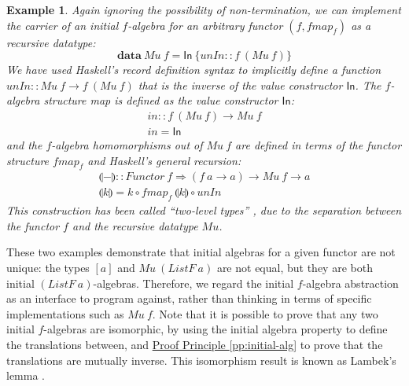 \documentclass{jfp1}
\newcommand{\fold}[1]{\llparenthesis #1 \rrparenthesis}
\newtheorem{example}{Example}
\newcommand{\proofprinref}[1]{\hyperref[#1]{Proof Principle \ref*{#1}}}
\newcommand{\kw}[1]{\textbf{#1}}
\begin{document}
\begin{example}
  Again ignoring the possibility of non-termination, we can implement
  the carrier of an initial $f$-algebra for an arbitrary functor $(f,
  \mathit{fmap}_f)$ as a recursive datatype:
  \begin{equation}\label{eq:mu-defn}
    \kw{data}~\mathit{Mu}~f = \mathsf{In}~\{ \mathit{unIn} :: f~(\mathit{Mu}~f) \}
  \end{equation}
  We have used Haskell's record definition syntax to implicitly define
  a function $\mathit{unIn} :: \mathit{Mu}~f \to f~(\mathit{Mu}~f)$
  that is the inverse of the value constructor $\mathsf{In}$.  The
  $f$-algebra structure map is defined as the value
  constructor $\mathsf{In}$:
  \begin{displaymath}
    \begin{array}{l}
      \mathit{in} :: f~(\mathit{Mu}~f) \to \mathit{Mu}~f \\
      \mathit{in} = \mathsf{In}
    \end{array}
  \end{displaymath}
  and the $f$-algebra homomorphisms out of $\mathit{Mu}~f$ are defined
  in terms of the functor structure $\mathit{fmap}_f$ and Haskell's
  general recursion:
  \begin{displaymath}
    \begin{array}{l}
      \fold{-} :: \mathit{Functor}~f \Rightarrow (f~a \to a) \to \mathit{Mu}~f \to a \\
      \fold{k} = k \circ \mathit{fmap}_f~\fold{k} \circ \mathit{unIn}
    \end{array}
  \end{displaymath}
  This construction has been called ``two-level types''
  \cite{sheard04twolevel}, due to the separation between the functor
  $f$ and the recursive datatype $\mathit{Mu}$.
\end{example}

These two examples demonstrate that initial algebras for a given
functor are not unique: the types $[a]$ and
$\mathit{Mu}~(\mathit{ListF}~a)$ are not equal, but they are both
initial $(\mathit{ListF}~a)$-algebras. Therefore, we regard the
initial $f$-algebra abstraction as an interface to program against,
rather than thinking in terms of specific implementations such as
$\mathit{Mu}~f$. Note that it is possible to prove that any two
initial $f$-algebras are isomorphic, by using the initial algebra
property to define the translations between, and
\proofprinref{pp:initial-alg} to prove that the translations are
mutually inverse. This isomorphism result is known as Lambek's lemma
\cite{LAMBEK68}.
\end{document}
